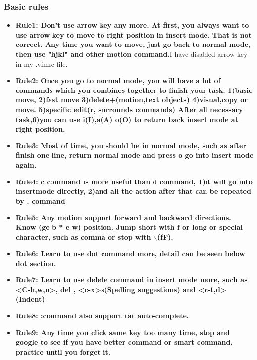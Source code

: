 \documentclass[a4paper,12pt,twoside]{book}
\begin{document}
\subsubsection{Basic rules}
\begin{itemize}

		\item \textbf{Rule1: Don't use arrow key any more. At first, you always want to use arrow key to move to right position in insert mode. That is not correct. Any time you want to move, just go back to normal mode, then use "hjkl" and other motion command.}I have disabled arrow key in my .vimrc file.

		\item \textbf{Rule2: Once you go to normal mode, you will have a lot of commands which you combines together to finish your task: 1)basic move, 2)fast move 3)delete+(motion,text objects) 4)visual,copy or move. 5)specific edit(r, surrounds commands) After all necessary task,6)you can use i(I),a(A) o(O) to return back insert mode at right position.} 

		\item  \textbf{Rule3: Most of time, you should be in normal mode,  such as after finish one line, return normal mode and press o go into insert mode again.} 

		\item \textbf{Rule4: c command is more useful than d command, 1)it will go into insertmode directly, 2)and all the action after that can be repeated by . command}

		\item \textbf{Rule5: Any motion support forward and backward directions. Know (ge b * e w) position. Jump short with f or long or special character, such as comma or stop with $\backslash$(fF).}

		\item \textbf{Rule6: Learn to use dot command more, detail can be seen below dot section.}

		\item \textbf{Rule7: Learn to use delete command in insert mode more, such as <C-h,w,u>, del , <c-x>s(Spelling suggestions) and <c-t,d>(Indent)} 

		\item \textbf{Rule8: :command also support tat auto-complete.} 
		
		\item \textbf{Rule9: Any time you click same key too many time, stop and google to see if you have better command or smart command, practice until you forget it. }


\end{itemize}
\end{document}
